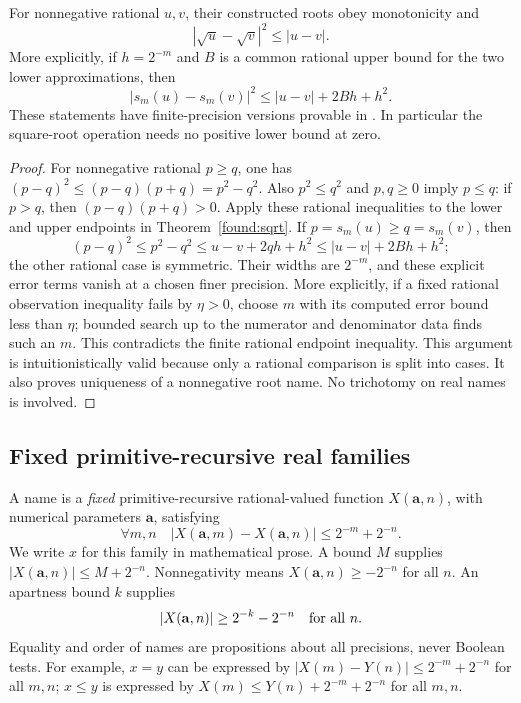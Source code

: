 \begin{lemma}\label{found:holder}
For nonnegative rational $u,v$, their constructed roots obey monotonicity and
\[
 |\sqrt u-\sqrt v|^2\le |u-v|.
\]
More explicitly, if $h=2^{-m}$ and $B$ is a common rational upper bound for the two lower approximations, then
\[
 |s_m(u)-s_m(v)|^2\le |u-v|+2Bh+h^2.
\]
These statements have finite-precision versions provable in \ipra. In particular the square-root operation needs no positive lower bound at zero.
\end{lemma}
\begin{proof}
For nonnegative rational $p\ge q$, one has
$(p-q)^2\le(p-q)(p+q)=p^2-q^2$. Also $p^2\le q^2$ and $p,q\ge0$ imply $p\le q$: if $p>q$, then $(p-q)(p+q)>0$. Apply these rational inequalities to the lower and upper endpoints in Theorem~\ref{found:sqrt}. If $p=s_m(u)\ge q=s_m(v)$, then
\[
 (p-q)^2\le p^2-q^2\le u-v+2qh+h^2
             \le |u-v|+2Bh+h^2;
\]
the other rational case is symmetric. Their widths are $2^{-m}$, and these explicit error terms vanish at a chosen finer precision. More explicitly, if a fixed rational observation inequality fails by $\eta>0$, choose $m$ with its computed error bound less than $\eta$; bounded search up to the numerator and denominator data finds such an $m$. This contradicts the finite rational endpoint inequality. This argument is intuitionistically valid because only a rational comparison is split into cases. It also proves uniqueness of a nonnegative root name. No trichotomy on real names is involved.
\end{proof}

\subsection{Fixed primitive-recursive real families}

\begin{definition}\label{found:names}
A name is a \emph{fixed} primitive-recursive rational-valued function
$X(\mathbf a,n)$, with numerical parameters $\mathbf a$, satisfying
\[
 \forall m,n\quad |X(\mathbf a,m)-X(\mathbf a,n)|
                 \le 2^{-m}+2^{-n}.
\]
We write $x$ for this family in mathematical prose. A bound $M$ supplies
$|X(\mathbf a,n)|\le M+2^{-n}$. Nonnegativity means
$X(\mathbf a,n)\ge-2^{-n}$ for all $n$. An apartness bound $k$ supplies
\[
 |X(\mathbf a,n)|\ge 2^{-k}-2^{-n}\quad\hbox{for all }n.
\]
Equality and order of names are propositions about all precisions, never Boolean tests. For example, $x=y$ can be expressed by
$|X(m)-Y(n)|\le2^{-m}+2^{-n}$ for all $m,n$; $x\le y$ is expressed by
$X(m)\le Y(n)+2^{-m}+2^{-n}$ for all $m,n$.
\end{definition}

